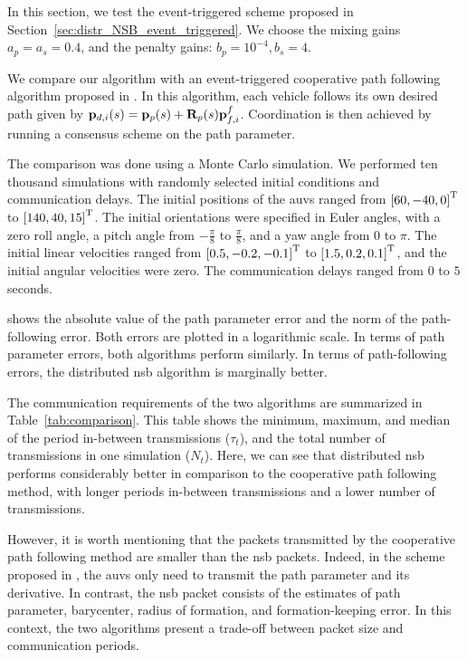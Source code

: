 In this section, we test the event-triggered scheme proposed in Section~\ref{sec:distr_NSB_event_triggered}.
We choose the mixing gains $a_p = a_s = 0.4$, and the penalty gains: $b_p = 10^{-4}, b_s = 4$.

We compare our algorithm with an event-triggered cooperative path following algorithm proposed in \cite{praveen_cooperative_2018}.
In this algorithm, each vehicle follows its own desired path given by $\mathbf{p}_{d,i}(s) = \mathbf{p}_p(s) + \mathbf{R}_p(s) \mathbf{p}_{f, i}^f$.
Coordination is then achieved by running a consensus scheme on the path parameter.

The comparison was done using a Monte Carlo simulation.
We performed ten thousand simulations with randomly selected initial conditions and communication delays.
The initial positions of the \glspl{auv} ranged from $\left[60,-40,0\right]^{\mathrm{T}}$ to $\left[140,40,15\right]^{\mathrm{T}}$.
The initial orientations were specified in Euler angles, with a zero roll angle, a pitch angle from $-\frac{\pi}{8}$ to $\frac{\pi}{8}$, and a yaw angle from $0$ to $\pi$.
The initial linear velocities ranged from $\left[0.5, -0.2, -0.1\right]^{\mathrm{T}}$ to $\left[1.5, 0.2, 0.1\right]^{\mathrm{T}}$, and the initial angular velocities were zero.
The communication delays ranged from $0$ to $5$ seconds.



 shows the absolute value of the path parameter error and the norm of the path-following error.
Both errors are plotted in a logarithmic scale.
In terms of path parameter errors, both algorithms perform similarly.
In terms of path-following errors, the distributed \gls{nsb} algorithm is marginally better.

The communication requirements of the two algorithms are summarized in Table~\ref{tab:comparison}.
This table shows the minimum, maximum, and median of the period in-between transmissions ($\tau_t$), and the total number of transmissions in one simulation ($N_t$).
Here, we can see that distributed \gls{nsb} performs considerably better in comparison to the cooperative path following method, with longer periods in-between transmissions and a lower number of transmissions.

However, it is worth mentioning that the packets transmitted by the cooperative path following method are smaller than the \gls{nsb} packets.
Indeed, in the scheme proposed in \cite{praveen_cooperative_2018}, the \glspl{auv} only need to transmit the path parameter and its derivative.
In contrast, the \gls{nsb} packet consists of the estimates of path parameter, barycenter, radius of formation, and formation-keeping error.
In this context, the two algorithms present a trade-off between packet size and communication periods.

